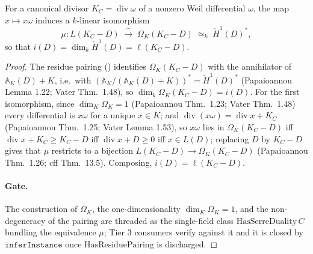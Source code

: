 \begin{theorem}
[Serre duality: \(i(D) = \ell(K_C - D)\)]
  \label{thm:adelic_serreDuality}
  \notready  %
  For a canonical divisor \(K_C = \operatorname{div}\omega\) of a nonzero
  Weil differential \(\omega\), the map \(x \mapsto x\omega\) induces a
  \(k\)-linear isomorphism
  \[
    \mu \colon L(K_C - D) \;\xrightarrow{\ \sim\ }\; \Omega_K(K_C - D)
    \;\simeq_k\; \check{H}^1(D)^\ast,
  \]
  so that \(i(D) = \dim_k \check{H}^1(D) = \ell(K_C - D)\).
\end{theorem}
\begin{proof}
  The residue pairing () identifies
  \(\Omega_K(K_C - D)\) with the annihilator of
  \(\mathbb{A}_K(D) + K\), i.e.\ with
  \((\mathbb{A}_K/(\mathbb{A}_K(D) + K))^\ast = \check{H}^1(D)^\ast\)
  (Papaioannou Lemma 1.22; Vater Thm.~1.48), so
  \(\dim_k \Omega_K(K_C - D) = i(D)\). For the first isomorphism, since
  \(\dim_K \Omega_K = 1\) (Papaioannou Thm.~1.23; Vater Thm.~1.48) every
  differential is \(x\omega\) for a unique \(x \in K\); and
  \(\operatorname{div}(x\omega) = \operatorname{div} x + K_C\) (Papaioannou
  Thm.~1.25; Vater Lemma 1.53), so \(x\omega\) lies in
  \(\Omega_K(K_C - D)\) iff \(\operatorname{div} x + K_C \ge K_C - D\) iff
  \(\operatorname{div} x + D \ge 0\) iff \(x \in L(D)\); replacing \(D\) by
  \(K_C - D\) gives that \(\mu\) restricts to a bijection
  \(L(K_C - D) \to \Omega_K(K_C - D)\) (Papaioannou Thm.~1.26; cff
  Thm.~13.5). Composing, \(i(D) = \ell(K_C - D)\).
  \paragraph{Gate.} The construction of \(\Omega_K\), the
  one-dimensionality \(\dim_K \Omega_K = 1\), and the non-degeneracy of
  the pairing are threaded as the single-field class
  \(\mathrm{HasSerreDuality}\, C\) bundling the equivalence \(\mu\);
  Tier 3 consumers verify against it and it is closed by
  \(\texttt{inferInstance}\) once \(\mathrm{HasResiduePairing}\) is discharged.
\end{proof}

